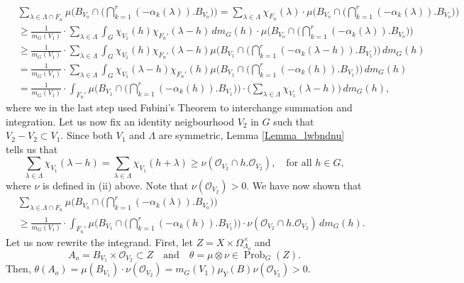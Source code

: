 \documentclass[12pt,reqno,a4paper]{amsart}
\numberwithin{equation}{section}
\newcommand{\cO}{\mathcal{O}}
\newcommand{\qand}{\quad \textrm{and} \quad}
\DeclareMathOperator{\Prob}{Prob}
\theoremstyle{theorem}
\theoremstyle{task}
\theoremstyle{definition}
\begin{document}
\begin{align*}
&\sum_{\lambda \in \Lambda \cap F_n} 
\mu\Big(B_{V_o} \cap \Big( \bigcap_{k=1}^r (-\alpha_k(\lambda)).B_{V_o}\Big)\Big) 
= \sum_{\lambda \in \Lambda} \chi_{F_n}(\lambda) \cdot \mu\Big(B_{V_o} \cap \Big( \bigcap_{k=1}^r (-\alpha_k(\lambda)).B_{V_o}\Big)\Big) 
\\[0.2cm]
&\geq \frac{1}{m_G(V_1)} \cdot \sum_{\lambda \in \Lambda} \int_G \chi_{V_1}(h) \chi_{F_n'}(\lambda-h) \, dm_G(h) \cdot \mu\Big(B_{V_o} \cap \Big( \bigcap_{k=1}^r (-\alpha_k(\lambda)).B_{V_o}\Big)\Big)
\\[0.1cm]
&\geq \frac{1}{m_G(V_1)} \cdot  \sum_{\lambda \in \Lambda} \int_G \chi_{V_1}(h) \chi_{F_n'}(\lambda-h) \mu\Big(B_{V_1} \cap \Big( \bigcap_{k=1}^r (-\alpha_k(\lambda-h)).B_{V_1}\Big)\Big)\, dm_G(h) \\[0.1cm]
&= 
\frac{1}{m_G(V_1)} \cdot \sum_{\lambda \in \Lambda} \int_G \chi_{V_1}(\lambda-h) \chi_{F_n'}(h) \mu\Big(B_{V_1} \cap \Big( \bigcap_{k=1}^r (-\alpha_k(h)).B_{V_1}\Big)\Big)\, dm_G(h) \\[0.1cm]
&= \frac{1}{m_G(V_1)} \cdot \int_{F_n'} \mu\Big(B_{V_1} \cap \Big( \bigcap_{k=1}^r (-\alpha_k(h)).B_{V_1}\Big)\Big) \cdot \Big( \sum_{\lambda \in \Lambda} \chi_{V_1}(\lambda-h) \Big) \, dm_G(h),
\end{align*}
where we in the last step used Fubini's Theorem to interchange summation and integration. Let us now fix an identity neigbourhood $V_2$ in $G$ such that $V_2 - V_2 \subset V_1$. Since both $V_1$ and $\Lambda$ are symmetric, Lemma \ref{Lemma_lwbndnu} tells us that
\[
\sum_{\lambda \in \Lambda} \chi_{V_1}(\lambda-h) = \sum_{\lambda \in \Lambda} \chi_{V_1}(h+\lambda)
\geq \nu(\cO_{V_2} \cap h.\cO_{V_2}), \quad \textrm{for all $h \in G$},
\]
where $\nu$ is defined in (ii) above. Note that $\nu(\cO_{V_2}) > 0$. We have now shown that
\begin{align}
&\sum_{\lambda \in \Lambda \cap F_n} 
\mu\Big(B_{V_o} \cap \Big( \bigcap_{k=1}^r (-\alpha_k(\lambda)).B_{V_o}\Big)\Big) \nonumber \\[0.2cm]
&\geq 
\frac{1}{m_G(V_1)} \cdot  \int_{F_n'} \mu\Big(B_{V_1} \cap \Big( \bigcap_{k=1}^r (-\alpha_k(h)).B_{V_1}\Big)\Big) \cdot \nu(\cO_{V_2} \cap h.\cO_{V_2}) \, dm_G(h). \label{V1}
\end{align}
Let us now rewrite the integrand. First, let $Z = X \times \Omega_{\Lambda_o}^{\times}$
and
\[
A_o = B_{V_1} \times \cO_{V_2} \subset Z \qand \theta = \mu \otimes \nu \in \Prob_G(Z).
\]
Then, $\theta(A_o) = \mu(B_{V_1}) \cdot \nu(\cO_{V_2}) = m_G(V_1) \mu_Y(B) \nu(\cO_{V_2}) > 0$. \\
\end{document}
